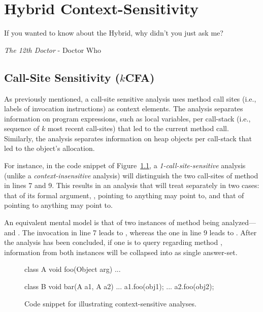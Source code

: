 \chapter{Hybrid Context-Sensitivity}\label{chapter:hybrid}

\epigraph{If you wanted to know about the Hybrid, why didn’t you just ask me?}{\textit{The 12th Doctor} - Doctor Who}

\section{Call-Site Sensitivity ($k$CFA)}

As previously mentioned, a call-site sensitive analysis uses method call sites (i.e., labels of invocation instructions) as context elements. The analysis separates information on program expressions, such as local variables, per call-stack (i.e., sequence of $k$ most recent call-sites) that led to the current method call. Similarly, the analysis separates information on heap objects per call-stack that led to the object's allocation.

For instance, in the code snippet of Figure~\ref{fig:hybrid:snippet}, a \emph{1-call-site-sensitive} analysis (unlike a \emph{context-insensitive} analysis) will distinguish the two call-sites of method  in lines 7 and 9. This results in an analysis that will treat  separately in two cases: that of its formal argument, , pointing to anything  may point to, and that of  pointing to anything  may point to.

An equivalent mental model is that of two instances of method  being analyzed--- and . The invocation in line 7 leads to , whereas the one in line 9 leads to . After the analysis has been concluded, if one is to query regarding method , information from both instances will be collapsed into as single answer-set.

\begin{figure}[h]
\begin{javacode}
class A {
    void foo(Object arg) { ... }
}

class B {
    void bar(A a1, A a2) {
        ...
        a1.foo(obj1);
        ...
        a2.foo(obj2);
    }
}
\end{javacode}
\caption{Code snippet for illustrating context-sensitive analyses.}
\label{fig:hybrid:snippet}
\end{figure}

